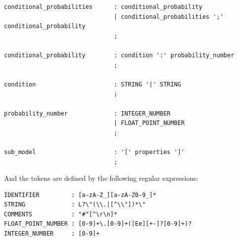 \begin{lstlisting}[frame=trbl]
conditional_probabilities      : conditional_probability
                               | conditional_probabilities ';' conditional_probability
                               ;

conditional_probability        : condition ':' probability_number
                               ;

condition                      : STRING '|' STRING
                               ;

probability_number             : INTEGER_NUMBER
                               | FLOAT_POINT_NUMBER
                               ;

sub_model                      : '[' properties ']'
                               ;
\end{lstlisting}

And the tokens are defined by the following regular expressions:

\begin{lstlisting}[frame=trbl]
IDENTIFIER         : [a-zA-Z_][a-zA-Z0-9_]*
STRING             : L?\"(\\.|[^\\"])*\"
COMMENTS           : "#"[^\r\n]*
FLOAT_POINT_NUMBER : [0-9]+\.[0-9]+([Ee][+-]?[0-9]+)?
INTEGER_NUMBER     : [0-9]+
\end{lstlisting}


